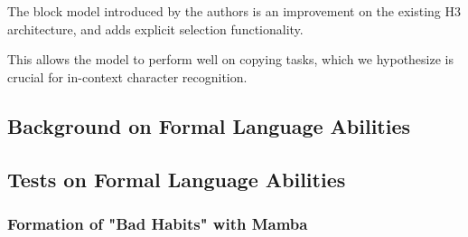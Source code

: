The block model introduced by the authors is an improvement on the existing
H3\cite{h3} architecture, and adds explicit selection functionality.

This allows the model to perform well on copying tasks, which we hypothesize
is crucial for in-context character recognition.

\subsection{Background on Formal Language Abilities}


\subsection{Tests on Formal Language Abilities}


\subsubsection{Formation of "Bad Habits" with Mamba}




